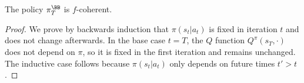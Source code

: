 
\begin{proposition}
    The policy $\pi^\BB_T$ is $f$-coherent.
\end{proposition}
\begin{proof}
    We prove by backwards induction that $\pi(s_t|a_t)$ is fixed in iteration $t$ and does not change afterwards. In the base case $t = T$, the $Q$ function $Q^\pi(s_T, \cdot)$ does not depend on $\pi$, so it is fixed in the first iteration and remains unchanged. The inductive case follows because $\pi(s_t|a_t)$ only depends on future times $t' > t$.
\end{proof}

